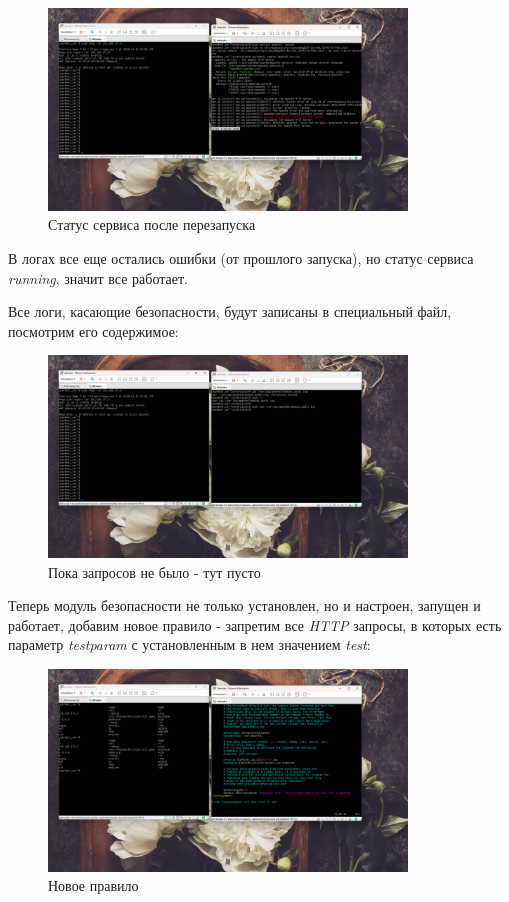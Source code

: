\documentclass[a4paper]{article}
\begin{document}
  \begin{figure}[H]
    \centering
    \includegraphics[width=0.85\textwidth]{03_00 (65)}
    \caption{Статус сервиса после перезапуска}
    \label{img:65}
  \end{figure}

  В логах все еще остались ошибки (от прошлого запуска), но статус сервиса \textit{running}, значит все работает.

  Все логи, касающие безопасности, будут записаны в специальный файл, посмотрим его содержимое:

  \begin{figure}[H]
    \centering
    \includegraphics[width=0.85\textwidth]{03_00 (66)}
    \caption{Пока запросов не было - тут пусто}
    \label{img:66}
  \end{figure}

  Теперь модуль безопасности не только установлен, но и настроен, запущен и работает,
  добавим новое правило - запретим все \textit{HTTP} запросы, в которых есть параметр \textit{testparam}
  с установленным в нем значением \textit{test}:

  \begin{figure}[H]
    \centering
    \includegraphics[width=0.85\textwidth]{03_00 (68)}
    \caption{Новое правило}
    \label{img:68}
  \end{figure}
\end{document}
